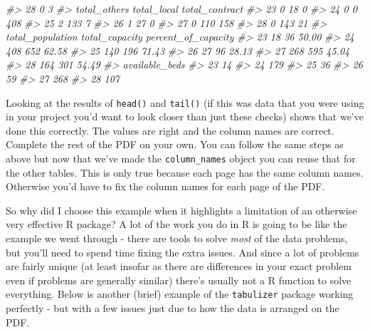 \documentclass[
]{krantz}
\makeatletter
\newenvironment{Shaded}{\begin{snugshade}}{\end{snugshade}}
\newcommand{\CommentTok}[1]{\textcolor[rgb]{0.37,0.37,0.37}{\textit{#1}}}
\newenvironment{kframe}{%
\medskip{}
\setlength{\fboxsep}{.8em}
 \def\at@end@of@kframe{}%
 \ifinner\ifhmode%
  \def\at@end@of@kframe{\end{minipage}}%
  \begin{minipage}{\columnwidth}%
 \fi\fi%
 \def\FrameCommand##1{\hskip\@totalleftmargin \hskip-\fboxsep
 \colorbox{shadecolor}{##1}\hskip-\fboxsep
     \hskip-\linewidth \hskip-\@totalleftmargin \hskip\columnwidth}%
 \MakeFramed {\advance\hsize-\width
   \@totalleftmargin\z@ \linewidth\hsize
   \@setminipage}}%
 {\par\unskip\endMakeFramed%
 \at@end@of@kframe}
\renewenvironment{Shaded}{\begin{kframe}}{\end{kframe}}
\makeatother
\begin{document}
\begin{Shaded}
\begin{Highlighting}[]
\CommentTok{\#\textgreater{} 28                        0                          3}
\CommentTok{\#\textgreater{}    total\_others total\_local total\_contract}
\CommentTok{\#\textgreater{} 23            0          18              0}
\CommentTok{\#\textgreater{} 24            0           0            408}
\CommentTok{\#\textgreater{} 25            2         133              7}
\CommentTok{\#\textgreater{} 26            1          27              0}
\CommentTok{\#\textgreater{} 27            0         110            158}
\CommentTok{\#\textgreater{} 28            0         143             21}
\CommentTok{\#\textgreater{}    total\_population total\_capacity percent\_of\_capacity}
\CommentTok{\#\textgreater{} 23               18             36               50.00}
\CommentTok{\#\textgreater{} 24              408            652               62.58}
\CommentTok{\#\textgreater{} 25              140            196               71.43}
\CommentTok{\#\textgreater{} 26               27             96               28.13}
\CommentTok{\#\textgreater{} 27              268            595               45.04}
\CommentTok{\#\textgreater{} 28              164            301               54.49}
\CommentTok{\#\textgreater{}    available\_beds}
\CommentTok{\#\textgreater{} 23             14}
\CommentTok{\#\textgreater{} 24            179}
\CommentTok{\#\textgreater{} 25             36}
\CommentTok{\#\textgreater{} 26             59}
\CommentTok{\#\textgreater{} 27            268}
\CommentTok{\#\textgreater{} 28            107}
\end{Highlighting}
\end{Shaded}

Looking at the results of \texttt{head()} and \texttt{tail()} (if this was data that you were using in your project you'd want to look closer than just these checks) shows that we've done this correctly. The values are right and the column names are correct. Complete the rest of the PDF on your own. You can follow the same steps as above but now that we've made the \texttt{column\_names} object you can reuse that for the other tables. This is only true because each page has the same column names. Otherwise you'd have to fix the column names for each page of the PDF.

So why did I choose this example when it highlights a limitation of an otherwise very effective R package? A lot of the work you do in R is going to be like the example we went through - there are tools to solve \emph{most} of the data problems, but you'll need to spend time fixing the extra issues. And since a lot of problems are fairly unique (at least insofar as there are differences in your exact problem even if problems are generally similar) there's usually not a R function to solve everything. Below is another (brief) example of the \texttt{tabulizer} package working perfectly - but with a few issues just due to how the data is arranged on the PDF.
\end{document}
